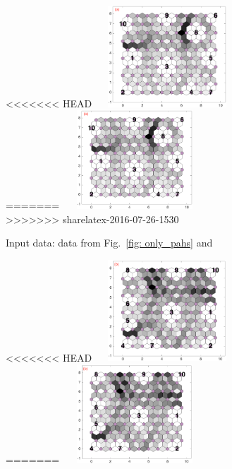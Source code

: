 \begin{figure}
    \begin{subfigure}[b]{0.25\textwidth}
        \centering
<<<<<<< HEAD
        \includegraphics[width=54mm, height=38mm]{../../images0.01/M31/2D/diff_dimension/combine_2D_data_between_cols3and11.png}
=======
        \includegraphics[width=54mm, height=37mm]{../../images0.01/M31/2D/diff_dimension/combine_2D_data_between_cols3and11.png}
>>>>>>> sharelatex-2016-07-26-1530
        \caption{Input data: data from Fig.~\ref{fig: only_pahs} and \halpha}
        \label{fig: col3and11_dist}
    \end{subfigure}
    \hfill
    \begin{subfigure}[b]{0.25\textwidth}
        \centering
<<<<<<< HEAD
        \includegraphics[width=54mm, height=38mm]{../../images0.01/M31/2D/diff_dimension/combine_2D_data_between_cols3and12.png}
=======
        \includegraphics[width=54mm, height=37mm]{../../images0.01/M31/2D/diff_dimension/combine_2D_data_between_cols3and12.png}

\end{subfigure}
\end{figure}

